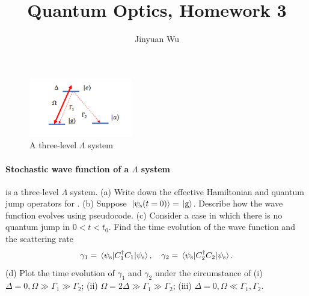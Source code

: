 \documentclass[hyperref, a4paper]{article}
\title{Quantum Optics, Homework 3}
\author{Jinyuan Wu}
\begin{document}
\maketitle

\begin{figure}
    \centering
    \includegraphics[width=0.4\textwidth]{fig1.png}
    \caption{A three-level $\Lambda$ system}
    \label{fig:sys-1}
\end{figure}

\paragraph{Stochastic wave function of a $\Lambda$ system}  is a three-level $\Lambda$ system.
(a) Write down the effective Hamiltonian and quantum jump operators for .
(b) Suppose $\ket*{\psi_\text{s}(t=0)} = \ket*{\text{g}}$. Describe how the wave function evolves using pseudocode.
(c) Consider a case in which there is no quantum jump in $0 < t < t_0$. Find the time evolution of the 
wave function and the scattering rate 
\begin{equation}
    \gamma_1 = \expval*{C_1^\dagger C_1}{\psi_\text{s}}, \quad \gamma_2 = \expval*{C_2^\dagger C_2}{\psi_\text{s}}.
\end{equation}
(d) Plot the time evolution of $\gamma_1$ and $\gamma_2$ under the circumstance of
(i) $\Delta = 0, \Omega \gg \Gamma_1 \gg \Gamma_2$;
(ii) $\Omega = 2 \Delta \gg \Gamma_1 \gg \Gamma_2$;
(iii) $\Delta = 0, \Omega \ll \Gamma_1 , \Gamma_2$.
\end{document}
